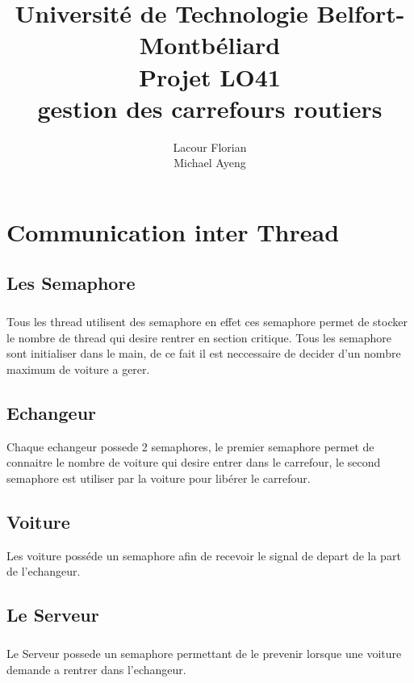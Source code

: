 \documentclass{report}
\title{Université de Technologie Belfort-Montbéliard\\
Projet LO41\\
gestion des carrefours routiers}
\author{Lacour Florian\\
Michael Ayeng}
\begin{document}
\maketitle

\tableofcontents



\chapter{Communication inter Thread}
	\section{Les Semaphore}
		\paragraph{}
			Tous les thread utilisent des semaphore en effet ces semaphore permet de stocker le nombre de thread qui desire rentrer en section critique. Tous les semaphore sont initialiser dans le main, de ce fait il est neccessaire de decider d'un nombre maximum de voiture a gerer.

		\section{Echangeur}
			Chaque echangeur possede 2 semaphores, le premier semaphore permet de connaitre le nombre de voiture qui desire entrer dans le carrefour, le second semaphore est utiliser par la voiture pour libérer le carrefour.

		\section{Voiture}
			Les voiture posséde un semaphore afin de recevoir le signal de depart de la part de l'echangeur. 

	\section{Le Serveur}
		\paragraph{}
			Le Serveur possede un semaphore permettant de le prevenir lorsque une voiture demande a rentrer dans l'echangeur.
		
		
	
\end{document}
